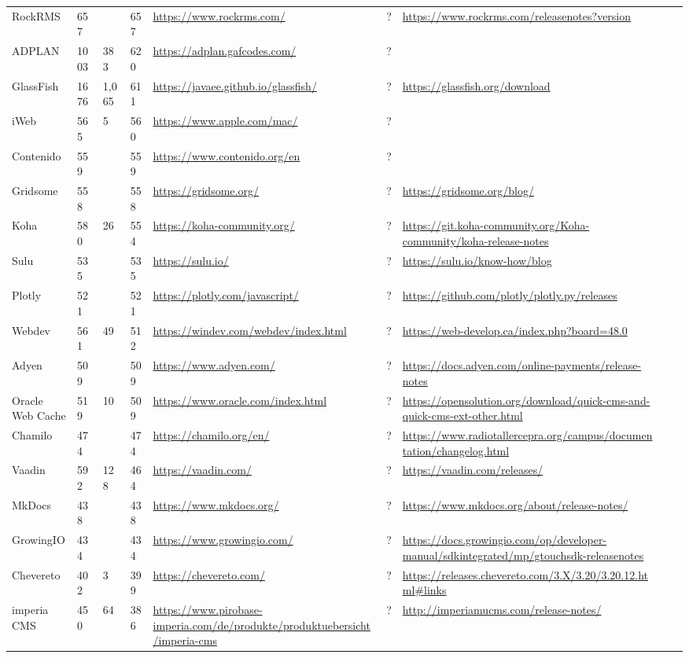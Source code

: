 \begin{table}[!htp]
\begin{tabular}{|l|l|l|l|l|l|l|l|l|}
				RockRMS &657 & &657 &\ul{https://www.rockrms.com/} &? &\ul{https://www.rockrms.com/releasenotes?version} & \\
				ADPLAN &1003 &383 &620 &\ul{https://adplan.gafcodes.com/} &? & & \\
				GlassFish &1676 &1,065 &611 &\ul{https://javaee.github.io/glassfish/} &? &\ul{https://glassfish.org/download} & \\
				iWeb &565 &5 &560 &\ul{https://www.apple.com/mac/} &? & & \\
				Contenido &559 & &559 &\ul{https://www.contenido.org/en} &? & & \\
				Gridsome &558 & &558 &\ul{https://gridsome.org/} &? &\ul{https://gridsome.org/blog/} & \\
				Koha &580 &26 &554 &\ul{https://koha-community.org/} &? &\ul{https://git.koha-community.org/Koha-community/koha-release-notes} & \\
				Sulu &535 & &535 &\ul{https://sulu.io/} &? &\ul{https://sulu.io/know-how/blog} & \\
				Plotly &521 & &521 &\ul{https://plotly.com/javascript/} &? &\ul{https://github.com/plotly/plotly.py/releases} & \\
				Webdev &561 &49 &512 &\ul{https://windev.com/webdev/index.html} &? &\ul{https://web-develop.ca/index.php?board=48.0} & \\
				Adyen &509 & &509 &\ul{https://www.adyen.com/} &? &\ul{https://docs.adyen.com/online-payments/release-notes} & \\
				Oracle Web Cache &519 &10 &509 &\ul{https://www.oracle.com/index.html} &? &\ul{https://opensolution.org/download/quick-cms-and-quick-cms-ext-other.html} & \\
				Chamilo &474 & &474 &\ul{https://chamilo.org/en/} &? &\ul{https://www.radiotallercepra.org/campus/documentation/changelog.html} & \\
				Vaadin &592 &128 &464 &\ul{https://vaadin.com/} &? &\ul{https://vaadin.com/releases/} & \\
				MkDocs &438 & &438 &\ul{https://www.mkdocs.org/} &? &\ul{https://www.mkdocs.org/about/release-notes/} & \\
				GrowingIO &434 & &434 &\ul{https://www.growingio.com/} &? &\ul{https://docs.growingio.com/op/developer-manual/sdkintegrated/mp/gtouchsdk-releasenotes} & \\
				Chevereto &402 &3 &399 &\ul{https://chevereto.com/} &? &\ul{https://releases.chevereto.com/3.X/3.20/3.20.12.html\#links} & \\
				imperia CMS &450 &64 &386 &\ul{https://www.pirobase-imperia.com/de/produkte/produktuebersicht/imperia-cms} &? &\ul{http://imperiamucms.com/release-notes/} & \\

\end{tabular}
\end{table}
